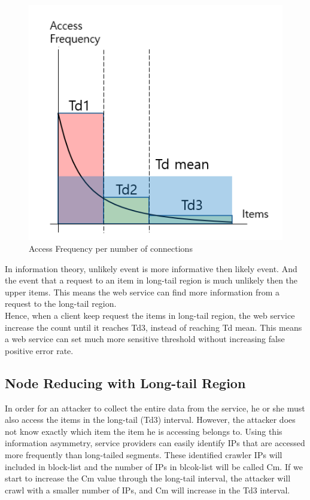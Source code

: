 \documentclass[sigconf,anonymous=true]{acmart}
\begin{document}
\begin{figure}[H]
    \includegraphics[width=0.7\columnwidth]{figs/figure_01.png}
    \caption{Access Frequency per number of connections}
    \label{fig:my_label}
\end{figure}

In information theory, unlikely event is more informative then likely event. And the event that a request to an item in long-tail region is much unlikely then the upper items. This means the web service can find more information from a request to the long-tail region.\\
Hence, when a client keep request the items in long-tail region, the web service increase the count until it reaches Td3, instead of reaching Td mean. This means a web service can set much more sensitive threshold without increasing false positive error rate.\\


\subsection{Node Reducing with Long-tail Region}
In order for an attacker to collect the entire data from the service, he or she must also access the items in the long-tail (Td3) interval. However, the attacker does not know exactly which item the item he is accessing belongs to. Using this information asymmetry, service providers can easily identify IPs that are accessed more frequently than long-tailed segments. These identified crawler IPs will included in block-list and the number of IPs in blcok-list will be called Cm. If we start to increase the Cm value through the long-tail interval, the attacker will crawl with a smaller number of IPs, and Cm will increase in the Td3 interval.
\end{document}
